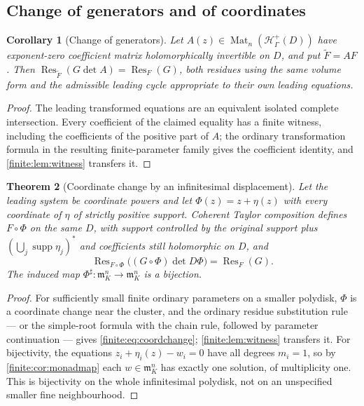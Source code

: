 \documentclass[11pt,letterpaper]{article}
\newtheorem{theorem}{Theorem}[section]
\newtheorem{corollary}[theorem]{Corollary}
\theoremstyle{definition}
\theoremstyle{remark}
\newcommand{\Hp}{\mathscr H^{+}}
\newcommand{\mm}{\mathfrak m}
\newcommand{\sh}{^{\sharp}}
\DeclareMathOperator{\supp}{supp}
\DeclareMathOperator{\Res}{Res}
\DeclareMathOperator{\Mat}{Mat}
\numberwithin{equation}{section}
\begin{document}
\subsection{Change of generators and of coordinates}
\label{finite:sec:transform}

\begin{corollary}[Change of generators]
\label{finite:cor:transformation}
Let $A(z)\in\Mat_n(\Hp_\Gamma(D))$ have exponent-zero coefficient matrix holomorphically invertible on $D$, and put $\widetilde F=AF$. Then $\Res_{\widetilde F}(G\det A)=\Res_F(G)$, both residues using the same volume form and the admissible leading cycle appropriate to their own leading equations.
\end{corollary}

\begin{proof}
The leading transformed equations are an equivalent isolated complete intersection. Every coefficient of the claimed equality has a finite witness, including the coefficients of the positive part of $A$; the ordinary transformation formula \cite{finite:GriffithsHarris} in the resulting finite-parameter family gives the coefficient identity, and \cref{finite:lem:witness} transfers it.
\end{proof}

\begin{theorem}[Coordinate change by an infinitesimal displacement]
\label{finite:thm:transform}
Let the leading system be coordinate powers and let $\Phi(z)=z+\eta(z)$ with every coordinate of $\eta$ of strictly positive support. Coherent Taylor composition defines $F\circ\Phi$ on the same $D$, with support controlled by the original support plus $(\bigcup_j\supp\eta_j)^*$ and coefficients still holomorphic on $D$, and
\begin{equation}\label{finite:eq:coordchange}
 \Res_{F\circ\Phi}\bigl((G\circ\Phi)\det D\Phi\bigr)=\Res_F(G).
\end{equation}
The induced map $\Phi\sh:\mm_K^n\to\mm_K^n$ is a bijection.
\end{theorem}

\begin{proof}
For sufficiently small finite ordinary parameters on a smaller polydisk, $\Phi$ is a coordinate change near the cluster, and the ordinary residue substitution rule --- or the simple-root formula with the chain rule, followed by parameter continuation --- gives \eqref{finite:eq:coordchange}; \cref{finite:lem:witness} transfers it. For bijectivity, the equations $z_i+\eta_i(z)-w_i=0$ have all degrees $m_i=1$, so by \cref{finite:cor:monadmap} each $w\in\mm_K^n$ has exactly one solution, of multiplicity one. This is bijectivity on the whole infinitesimal polydisk, not on an unspecified smaller fine neighbourhood.
\end{proof}
\end{document}

